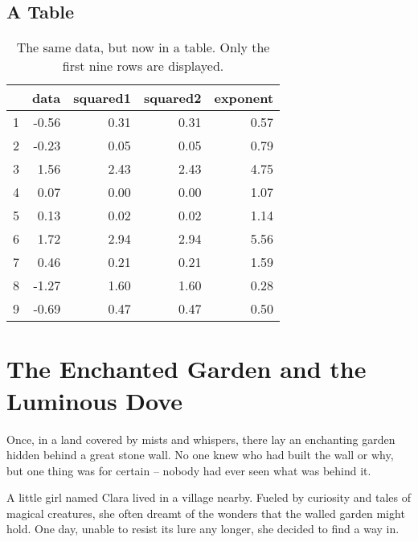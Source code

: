 \documentclass[10pt, a4paper, titlepage]{article}
\begin{document}
\subsection{A Table}

\begin{table}[H]
\centering
\caption{The same data, but now in a table. Only the first nine rows are displayed.}
\begin{tabular}{rrrrr}
\toprule
 & \textbf{data} & \textbf{squared1} & \textbf{squared2} & \textbf{exponent} \\
 \midrule
1 & -0.56        & 0.31              & 0.31              & 0.57              \\
2 & -0.23        & 0.05              & 0.05              & 0.79              \\
3 & 1.56         & 2.43              & 2.43              & 4.75              \\
4 & 0.07         & 0.00              & 0.00              & 1.07              \\
5 & 0.13         & 0.02              & 0.02              & 1.14              \\
6 & 1.72         & 2.94              & 2.94              & 5.56              \\
7 & 0.46         & 0.21              & 0.21              & 1.59              \\
8 & -1.27        & 1.60              & 1.60              & 0.28              \\
9 & -0.69        & 0.47              & 0.47              & 0.50              \\
\bottomrule
\end{tabular}
\end{table}

\section{The Enchanted Garden and the Luminous Dove}

Once, in a land covered by mists and whispers, there lay an enchanting garden hidden behind a great stone wall. No one knew who had built the wall or why, but one thing was for certain – nobody had ever seen what was behind it.

A little girl named Clara lived in a village nearby. Fueled by curiosity and tales of magical creatures, she often dreamt of the wonders that the walled garden might hold. One day, unable to resist its lure any longer, she decided to find a way in.
\end{document}
